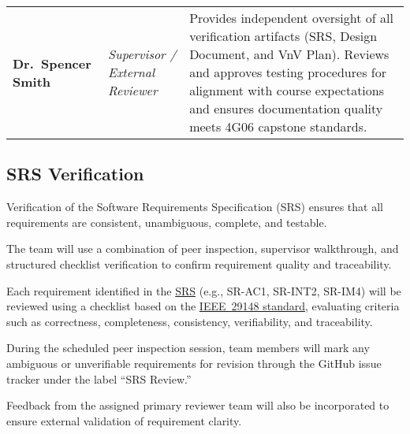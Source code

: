 \documentclass[12pt, titlepage]{article}
\begin{document}
\begin{center}
\begin{longtable}{|>{\raggedright\arraybackslash}p{}|
                    >{\raggedright\arraybackslash}p{}|
                    >{\raggedright\arraybackslash}p{}|}
\textbf{Dr.\ Spencer Smith} &
\textit{Supervisor / External Reviewer} &
Provides independent oversight of all verification artifacts (SRS, Design Document, and VnV Plan). Reviews and approves testing procedures for alignment with course expectations and ensures documentation quality meets 4G06 capstone standards. \\
\end{longtable}
\end{center}



\subsection{SRS Verification}
\label{subsec:srs-verification}


Verification of the Software Requirements Specification (SRS) ensures that all
requirements are consistent, unambiguous, complete, and testable.

The team will use a combination of peer inspection, supervisor walkthrough, and
structured checklist verification to confirm requirement quality and
traceability.

Each requirement identified in the \href{https://github.com/thaafei/DomainX/blob/main/docs/SRS/SRS.pdf}{SRS} (e.g., SR-AC1, SR-INT2, SR-IM4) will be
reviewed using a checklist based on the \href{https://standards.ieee.org/ieee/29148/6937/}{IEEE~29148 standard}, evaluating criteria
such as correctness, completeness, consistency, verifiability, and
traceability.

During the scheduled peer inspection session, team members will mark any
ambiguous or unverifiable requirements for revision through the GitHub issue
tracker under the label ``SRS Review.''

Feedback from the assigned primary reviewer team will also be incorporated to
ensure external validation of requirement clarity.
\end{document}
